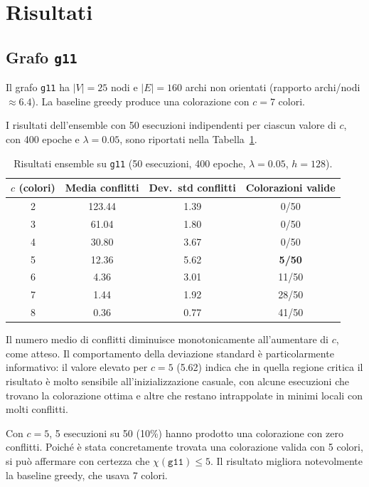 \documentclass{article}
\begin{document}
\section{Risultati}

\subsection*{Grafo \texttt{g11}}

Il grafo \texttt{g11} ha $|V| = 25$ nodi e $|E| = 160$ archi non orientati (rapporto
archi/nodi $\approx 6.4$). La baseline greedy produce una colorazione con $c = 7$ colori.

I risultati dell'ensemble con 50 esecuzioni indipendenti per ciascun valore di $c$, con
400 epoche e $\lambda = 0.05$, sono riportati nella Tabella~\ref{tab:g11}.

\begin{table}[h]
\centering
\caption{Risultati ensemble su \texttt{g11} (50 esecuzioni, 400 epoche, $\lambda = 0.05$, $h = 128$).}
\label{tab:g11}
\begin{tabular}{cccc}
\toprule
$c$ (colori) & Media conflitti & Dev.\ std conflitti & Colorazioni valide \\
\midrule
2 & 123.44 & 1.39 & 0/50 \\
3 & 61.04  & 1.80 & 0/50 \\
4 & 30.80  & 3.67 & 0/50 \\
5 & 12.36  & 5.62 & \textbf{5/50} \\
6 &  4.36  & 3.01 & 11/50 \\
7 &  1.44  & 1.92 & 28/50 \\
8 &  0.36  & 0.77 & 41/50 \\
\bottomrule
\end{tabular}
\end{table}

Il numero medio di conflitti diminuisce monotonicamente all'aumentare di $c$, come atteso. Il comportamento della
deviazione standard è particolarmente informativo: il valore elevato per $c = 5$ (5.62)
indica che in quella regione critica il risultato è molto sensibile all'inizializzazione
casuale, con alcune esecuzioni che trovano la colorazione ottima e altre che restano
intrappolate in minimi locali con molti conflitti.

Con $c = 5$, 5 esecuzioni su 50 (10\%) hanno prodotto una colorazione con zero conflitti.
Poiché è stata concretamente trovata una colorazione valida con 5 colori, si può affermare
con certezza che $\chi(\texttt{g11}) \leq 5$. Il risultato migliora notevolmente la
baseline greedy, che usava 7 colori.
\end{document}
